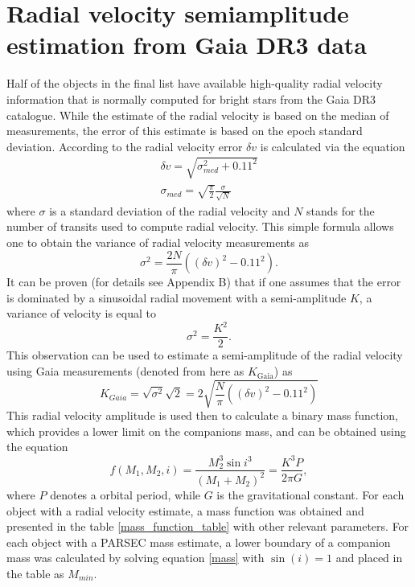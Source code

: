 \documentclass{pracalicmgr}
\begin{document}
\section{Radial velocity semiamplitude estimation from Gaia DR3 data}
Half of the objects in the final list have available high-quality radial velocity information that is normally computed for bright stars from the Gaia DR3 catalogue.
While the estimate of the radial velocity is based on the median of measurements, 
the error of this estimate is based on the epoch standard deviation. According to \citet{katz_gaia_2022} the radial velocity error $\delta v$ 
is calculated via the equation
\begin{align}
    \delta v=\sqrt{\sigma_{med}^2+0.11^2}\\
    \sigma_{med}=\sqrt{\frac{\pi}{2}}\frac{\sigma}{\sqrt{N}}
\end{align}
where $\sigma$ is a standard deviation of the radial velocity and $N$ stands for the number of transits used to compute radial velocity. This simple formula allows one to obtain the 
variance of radial velocity measurements as 
\begin{equation}
    \sigma^2=\frac{2N}{\pi}\left((\delta v)^2-0.11^2\right).
\end{equation}
It can be proven (for details see Appendix B) that if one assumes that the error is dominated by a sinusoidal radial movement with a semi-amplitude $K$,
a variance of velocity is equal to
\begin{equation}
    \sigma^2=\frac{K^2}{2}.
\end{equation}
This observation can be used to estimate a semi-amplitude of the radial velocity using Gaia measurements (denoted from here as $K_{\textrm{Gaia}}$) as 
\begin{equation}
    K_{Gaia}=\sqrt{\sigma^2}\sqrt{2}=2\sqrt{\frac{N}{\pi}\left((\delta v)^2-0.11^2\right)}
\end{equation}
This radial velocity amplitude is used then to calculate a binary mass function, which provides a lower limit on the companions mass, and can be obtained using the equation
\begin{equation}\label{mass}
    f(M_1,M_2,i)=\frac{M_2^3 \sin{i}^3}{(M_1+M_2)^2}=\frac{K^3 P}{2\pi G},
\end{equation}
where $P$ denotes a orbital period, while $G$ is the gravitational constant. For each object with a radial velocity estimate, a mass function was obtained
and presented in the table \ref{mass_function_table} with other relevant parameters.
For each object with a PARSEC mass estimate, a lower boundary of a companion mass was calculated by solving equation \ref{mass}
with $\sin{(i)}=1$ and placed in the table as $M_{min}$.
\end{document}
